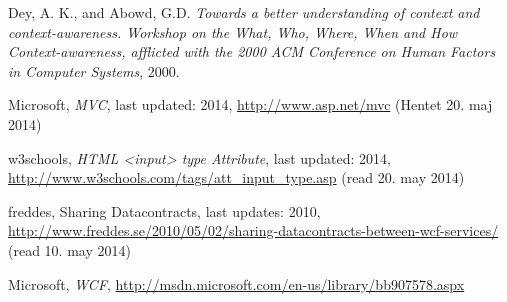 \documentclass[../report.tex]{subfiles}
\begin{document}
\graphicspath{{img/}{../img/}}
\begingroup
\renewcommand{\chapter}[2]{}%
\begin{thebibliography}{}

  Dey, A. K., and Abowd, G.D.
  \emph{Towards a better understanding of context and context-awareness. Workshop on the What, Who, Where, When and How Context-awareness, afflicted with the 2000 ACM Conference on Human Factors in Computer Systems},
  2000. 

Microsoft, \textit{MVC}, last updated: 2014, \url{http://www.asp.net/mvc} (Hentet  20. maj 2014)

w3schools, \textit{HTML <input> type Attribute}, last updated: 2014,  \url{http://www.w3schools.com/tags/att\_input\_type.asp} (read 20. may 2014)

freddes, Sharing Datacontracts, last updates: 2010, \url{http://www.freddes.se/2010/05/02/sharing-datacontracts-between-wcf-services/} (read 10. may 2014)

Microsoft, \textit{WCF}, \url{http://msdn.microsoft.com/en-us/library/bb907578.aspx}

\end{thebibliography}
\endgroup
\end{document}
